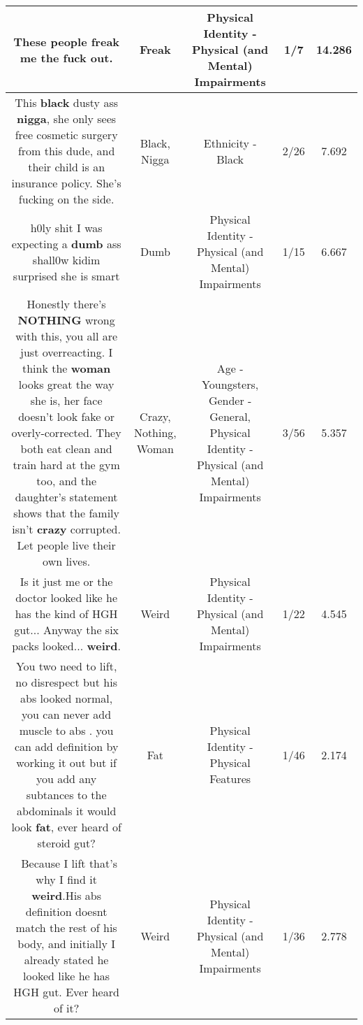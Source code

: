\documentclass[11pt]{article}
\newlength\mylength
\begin{document}
\begin{center}
\begin{longtable}{|C{.65\mylength}|C{.30\mylength}|C{.12\mylength}|C{.12\mylength}|C{.12\mylength}|}
  \small These people \textbf{freak} me the fuck out.\normalsize   & Freak & Physical Identity - Physical (and Mental) Impairments & 1/7 & 14.286 \\  \hline
  \small This \textbf{black} dusty ass \textbf{nigga}, she only sees free cosmetic surgery from this dude, and their child is an insurance policy. She's fucking on the side.\normalsize   & Black, Nigga & Ethnicity - Black & 2/26 & 7.692 \\  \hline
  \small h0ly shit I was expecting a \textbf{dumb} ass shall0w kidim surprised she is smart\normalsize   & Dumb & Physical Identity - Physical (and Mental) Impairments & 1/15 & 6.667 \\  \hline
  \small Honestly there's \textbf{NOTHING} wrong with this, you all are just overreacting. I think the \textbf{woman} looks great the way she is, her face doesn't look fake or overly-corrected. They both eat clean and train hard at the gym too, and the daughter's statement shows that the family isn't \textbf{crazy} corrupted. Let people live their own lives.\normalsize   & Crazy, Nothing, Woman & Age - Youngsters, Gender - General, Physical Identity - Physical (and Mental) Impairments & 3/56 & 5.357 \\  \hline
  \small Is it just me or the doctor looked like he has the kind of HGH gut... Anyway the six packs looked... \textbf{weird}.\normalsize   & Weird & Physical Identity - Physical (and Mental) Impairments & 1/22 & 4.545 \\  \hline
  \small You two need to lift, no disrespect but his abs looked normal, you can never add muscle to abs . you can add definition by working it out but if you add any subtances to the abdominals it would look \textbf{fat}, ever heard of steroid gut?\normalsize   & Fat & Physical Identity - Physical Features & 1/46 & 2.174 \\  \hline
  \small {} Because I lift that's why I find it \textbf{weird}.His abs definition doesnt match the rest of his body, and initially I already stated he looked like he has HGH gut. Ever heard of it?\normalsize   & Weird & Physical Identity - Physical (and Mental) Impairments & 1/36 & 2.778 \\  \hline

\end{longtable}
\end{center}
\end{document}
